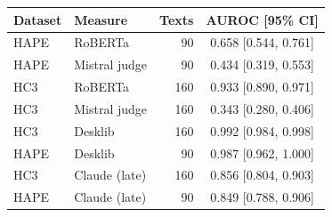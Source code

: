\begin{tabular}{llrc}
\toprule
Dataset & Measure & Texts & AUROC [95\% CI] \\
\midrule
HAPE & RoBERTa & 90 & 0.658 [0.544, 0.761] \\
HAPE & Mistral judge & 90 & 0.434 [0.319, 0.553] \\
HC3 & RoBERTa & 160 & 0.933 [0.890, 0.971] \\
HC3 & Mistral judge & 160 & 0.343 [0.280, 0.406] \\
HC3 & Desklib & 160 & 0.992 [0.984, 0.998] \\
HAPE & Desklib & 90 & 0.987 [0.962, 1.000] \\
HC3 & Claude (late) & 160 & 0.856 [0.804, 0.903] \\
HAPE & Claude (late) & 90 & 0.849 [0.788, 0.906] \\
\bottomrule
\end{tabular}
